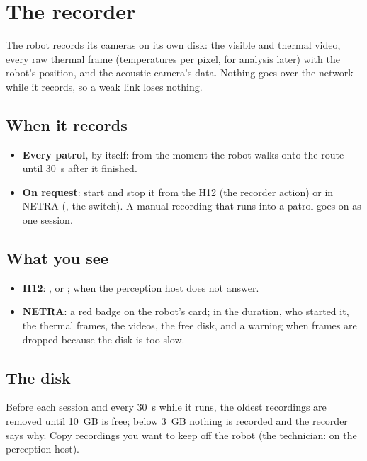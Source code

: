 \chapter{The recorder}
\label{ch:u-recorder}

The robot records its cameras on its own disk: the visible and thermal video, every raw thermal
frame (temperatures per pixel, for analysis later) with the robot's position, and the acoustic
camera's data. Nothing goes over the network while it records, so a weak link loses nothing.

\section{When it records}

\begin{itemize}
  \item \textbf{Every patrol}, by itself: from the moment the robot walks onto the route until
    30~s after it finished.
  \item \textbf{On request}: start and stop it from the H12 (the recorder action) or in NETRA
    (, the switch). A manual recording that runs into a patrol
    goes on as one session.
\end{itemize}

\section{What you see}

\begin{itemize}
  \item \textbf{H12}: , or ;  when the perception host does not answer.
  \item \textbf{NETRA}: a red  badge on the robot's card; in  the
    duration, who started it, the thermal frames, the videos, the free disk, and a warning when
    frames are dropped because the disk is too slow.
\end{itemize}

\section{The disk}

Before each session and every 30~s while it runs, the oldest recordings are removed until 10~GB
is free; below 3~GB nothing is recorded and the recorder says why. Copy recordings you want to
keep off the robot (the technician:  on the perception host).
